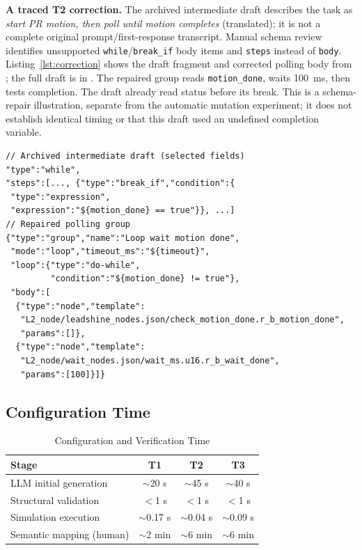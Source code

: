 \documentclass[conference]{IEEEtran}
\begin{document}
\textbf{A traced T2 correction.} The archived intermediate draft describes the task as \emph{start PR motion, then poll until motion completes} (translated); it is not a complete original prompt/first-response transcript. Manual schema review identifies unsupported \texttt{while}/\texttt{break\_if} body items and \texttt{steps} instead of \texttt{body}. Listing~\ref{lst:correction} shows the draft fragment and corrected polling body from ; the full draft is in . The repaired group reads \texttt{motion\_done}, waits 100~ms, then tests completion. The draft already read status before its break. This is a schema-repair illustration, separate from the automatic mutation experiment; it does not establish identical timing or that this draft used an undefined completion variable.

\begin{lstlisting}[float=t,caption={T2 polling: archived fragment and repaired group.},label={lst:correction},captionpos=t]
// Archived intermediate draft (selected fields)
"type":"while",
"steps":[..., {"type":"break_if","condition":{
 "type":"expression",
 "expression":"${motion_done} == true"}}, ...]
// Repaired polling group
{"type":"group","name":"Loop wait motion done",
 "mode":"loop","timeout_ms":"${timeout}",
 "loop":{"type":"do-while",
         "condition":"${motion_done} != true"},
 "body":[
  {"type":"node","template":
   "L2_node/leadshine_nodes.json/check_motion_done.r_b_motion_done",
   "params":[]},
  {"type":"node","template":
   "L2_node/wait_nodes.json/wait_ms.u16.r_b_wait_done",
   "params":[100]}]}
\end{lstlisting}

\subsection{Configuration Time}

\begin{table}[t]
\caption{Configuration and Verification Time}
\label{tab:time}
\centering
\small
\begin{tabular}{|P{3.0cm}|c|c|c|}
\hline
\textbf{Stage} & \textbf{T1} & \textbf{T2} & \textbf{T3}\\
\hline
LLM initial generation & $\sim$20 s & $\sim$45 s & $\sim$40 s\\
\hline
Structural validation & $<$1 s & $<$1 s & $<$1 s\\
\hline
Simulation execution & $\sim$0.17 s & $\sim$0.04 s & $\sim$0.09 s\\
\hline
Semantic mapping (human) & $\sim$2 min & $\sim$6 min & $\sim$6 min\\
\hline
\end{tabular}
\end{table}
\end{document}
